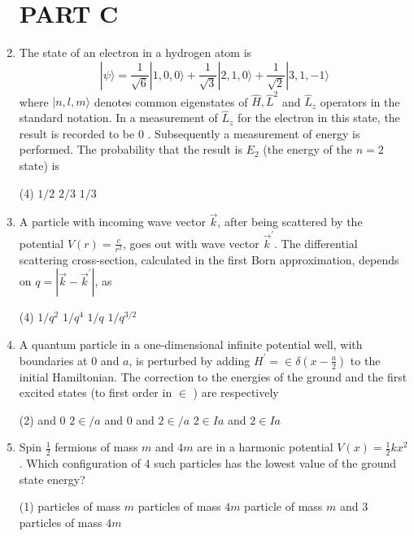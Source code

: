 \begin{enumerate}
\section{PART C}
\item  The state of an electron in a hydrogen atom is
$$
|\psi\rangle=\frac{1}{\sqrt{6}}|1,0,0\rangle+\frac{1}{\sqrt{3}}|2,1,0\rangle+\frac{1}{\sqrt{2}}|3,1,-1\rangle
$$
where $|n, l, m\rangle$ denotes common eigenstates of $\hat{H}, \hat{L}^{2}$ and $\hat{L}_{z}$ operators in the standard notation.
In a measurement of $\hat{L}_{z}$ for the electron in this state, the result is recorded to be 0 . Subsequently a measurement of energy is performed. The probability that the result is $E_{2}$ (the energy of the $n=2$ state) is
 \begin{tasks}(4)
	\task[\textbf{b.}] $1 / 2$
	\task[\textbf{c.}] $2 / 3$
	\task[\textbf{d.}] $1 / 3$
\end{tasks}
\item  A particle with incoming wave vector $\vec{k}$, after being scattered by the potential $V(r)=\frac{c}{r^{2}}$, goes out with wave vector $\vec{k}^{\prime}$. The differential scattering cross-section, calculated in the first Born approximation, depends on $q=\left|\vec{k}-\vec{k}^{\prime}\right|$, as
 \begin{tasks}(4)
	\task[\textbf{a.}]$1 / q^{2}$
	\task[\textbf{b.}]$1 / q^{4}$
	\task[\textbf{c.}]$1 / q$
	\task[\textbf{d.}] $1 / q^{3 / 2}$
\end{tasks}
\item  A quantum particle in a one-dimensional infinite potential well, with boundaries at 0 and $a$, is perturbed by adding $H^{\prime}=\in \delta\left(x-\frac{a}{2}\right)$ to the initial Hamiltonian. The correction to the energies of the ground and the first excited states (to first order in $\in$ ) are respectively
 \begin{tasks}(2)
	 and 0
	\task[\textbf{b.}] $2 \in / a$ and 0
	 and $2 \in / a$
	\task[\textbf{d.}] $2 \in I a$ and $2 \in I a$ 
\end{tasks}
\item Spin $\frac{1}{2}$ fermions of mass $m$ and $4 m$ are in a harmonic potential $V(x)=\frac{1}{2} k x^{2}$. Which configuration of 4 such particles has the lowest value of the ground state energy?
 \begin{tasks}(1)
	 particles of mass $m$
	 particles of mass $4 m$
	 particle of mass $m$ and 3 particles of mass $4 m$

\end{tasks}
\end{enumerate}
